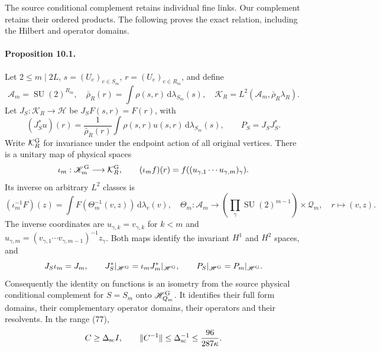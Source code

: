 \documentclass[11pt]{article}
\newcommand{\SU}{\operatorname{SU}}
\newcommand{\dd}{\,\mathrm d}
\newcommand{\HH}{\mathscr H}
\newcommand{\KK}{\mathscr K}
\begin{document}
The source conditional complement retains individual fine links.
Our complement retains their ordered products. The following proves
the exact relation, including the Hilbert and operator domains.

\paragraph{Proposition 10.1.}
Let $2\leq m\mid2L$, $s=(U_e)_{e\in S_m}$,
$r=(U_e)_{e\in R_m}$, and define
\[
 \mathcal A_m=\SU(2)^{R_m},\quad
 \bar\rho_R(r)=\int\rho(s,r)\dd\lambda_{S_m}(s),\quad
 \mathcal K_R=L^2(\mathcal A_m,\bar\rho_R\lambda_R).
\]
Let $J_S:\mathcal K_R\to\HH$ be $J_SF(s,r)=F(r)$, with
\[
 (J_S^*u)(r)=\frac{1}{\bar\rho_R(r)}
                \int\rho(s,r)u(s,r)\dd\lambda_{S_m}(s),
 \qquad P_S=J_SJ_S^*.
\]
Write $\mathcal K_R^{\rm G}$ for invariance under the endpoint action
of all original vertices. There is a unitary map of physical spaces
\begin{equation}\label{eq:skeletonunitary}
 \iota_m:\KK_m^{\rm G}\longrightarrow\mathcal K_R^{\rm G},
 \qquad (\iota_m f)(r)=f((u_{\gamma,1}\cdots u_{\gamma,m})_\gamma).
\end{equation}
Its inverse on arbitrary $L^2$ classes is
\begin{equation}\label{eq:skeletoninverse}
 (\iota_m^{-1}F)(z)=\int F(\Theta_m^{-1}(v,z))\dd\lambda_v(v),
 \quad
 \Theta_m:\mathcal A_m\longrightarrow
 \left(\prod_\gamma\SU(2)^{m-1}\right)\times\mathcal Q_m,
 \quad r\longmapsto(v,z).
\end{equation}
The inverse coordinates are $u_{\gamma,k}=v_{\gamma,k}$ for $k<m$
and $u_{\gamma,m}=(v_{\gamma,1}\cdots v_{\gamma,m-1})^{-1}z_\gamma$.
Both maps identify the invariant $H^1$ and $H^2$ spaces, and
\begin{equation}\label{eq:physicalprojections}
 J_S\iota_m=J_m,
 \qquad J_S^*|_{\HH^{\rm G}}=\iota_mJ_m^*|_{\HH^{\rm G}},
 \qquad P_S|_{\HH^{\rm G}}=P_m|_{\HH^{\rm G}}.
\end{equation}
Consequently the identity on functions is an isometry from the
source physical conditional complement for $S=S_m$ onto
$\HH_{Q_m}^{\rm G}$. It identifies their full form domains,
their complementary operator domains, their operators and their
resolvents. In the range (77),
\begin{equation}\label{eq:uniformC}
 C\geq\Delta_{\rm sc} I,\qquad
 \|C^{-1}\|\leq\Delta_{\rm sc}^{-1}
                  \leq\frac{96}{287\kappa}.
\end{equation}
\end{document}
